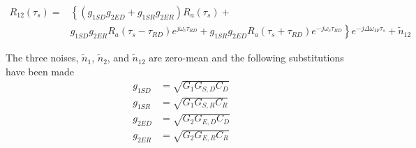 \documentclass[draftcls,onecolumn]{IEEEtran}  %
\begin{document}
\begin{equation}
    \begin{split}
    	R_{12}(\tau_s) = & \left\{  
       \left( g_{1SD} g_{2ED} + g_{1SR}g_{2ER} \right) R_a(\tau_s) +
       \right. \\
       & \left. 
       g_{1SD} g_{2ER} R_a(\tau_s-\tau_{RD})  e^{j\omega_c \tau_{RD}}+ 
       g_{1SR} g_{2ED} R_a(\tau_s+\tau_{RD})  e^{-j\omega_c \tau_{RD}}
       \right\} e^{-j\Delta\omega_{IF}\tau_s} + \tilde{n}_{12}    
   \label{Eq:R12}
   \end{split}
\end{equation}

%

The three noises, $\tilde{n}_1$, $\tilde{n}_2$, and $\tilde{n}_{12}$ are zero-mean and the following substitutions have been made
\begin{eqnarray}
	g_{1SD} &= \sqrt{G_1 G_{S,D} C_D} \label{Eq:g1sd} \\
    g_{1SR} &= \sqrt{G_1 G_{S,R} C_R} \label{Eq:g1sr} \\
    g_{2ED} &= \sqrt{G_2 G_{E,D} C_D} \label{Eq:g2ed} \\
    g_{2ER} &= \sqrt{G_2 G_{E,R} C_R} \label{Eq:g2er}
\end{eqnarray}
\end{document}
